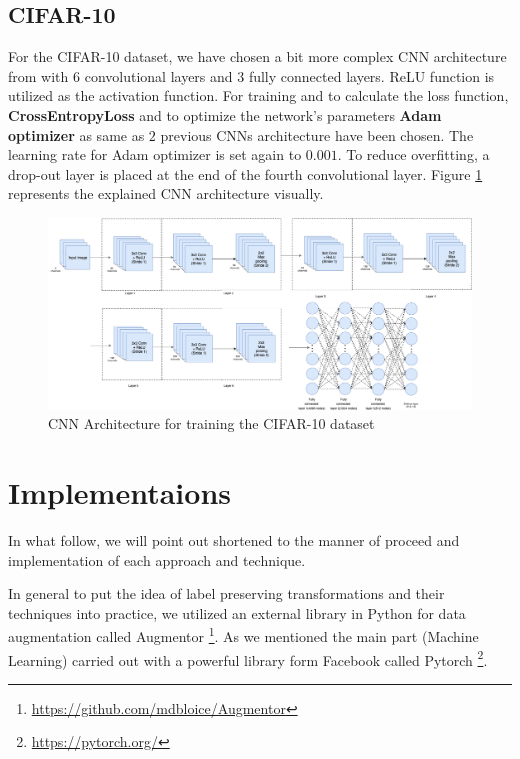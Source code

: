 \subsection{CIFAR-10}
For the CIFAR-10 dataset, we have chosen a bit more complex CNN architecture from \cite{CIFAR_CNN_Architecture} with $6$
convolutional layers and $3$ fully connected layers. ReLU function is utilized as the activation
function. For training and to calculate the loss function, \textbf{CrossEntropyLoss} and
to optimize the network's parameters \textbf{Adam optimizer} as same as $2$ previous CNNs architecture have been
chosen. The learning rate for Adam optimizer is set again to $0.001$. To reduce overfitting, a
drop-out layer is placed at the end of the fourth convolutional layer. Figure \ref{fig:CIFAR_CNN_Architecture} represents the explained CNN architecture visually. 


\begin{figure}
  \centering
  \label{fig:CIFAR_CNN_Architecture}
  \includegraphics[width=1\textwidth]{fig/CIFAR-CNN-Architecture}
  \caption{CNN Architecture for training the CIFAR-10 dataset}
\end{figure}

\section{Implementaions}
In what follow, we will point out shortened to the manner of proceed and implementation of each
approach and technique. 

In general to put the idea of label preserving transformations and their techniques
into practice, we utilized an external library in Python for data augmentation called Augmentor \footnote{\url{https://github.com/mdbloice/Augmentor}}. As
we mentioned the main part (Machine Learning) carried out with a powerful library form Facebook
called Pytorch \footnote{\url{https://pytorch.org/}}. 

